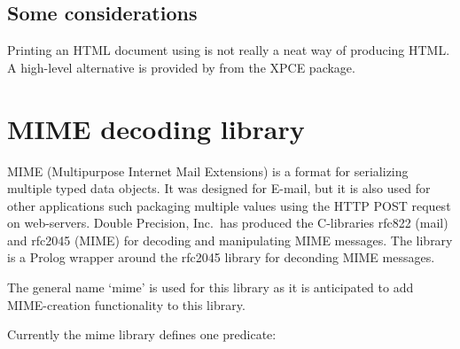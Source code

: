 \documentclass[11pt]{article}
\begin{document}
\noindent
\subsection{Some considerations}

Printing an HTML document using  is not really a neat way
of producing HTML.  A high-level alternative is provided by
 from the XPCE package.


\section{MIME decoding library}

MIME (Multipurpose Internet Mail Extensions) is a format for serializing
multiple typed data objects.  It was designed for E-mail, but it is also
used for other applications such packaging multiple values using the
HTTP POST request on web-servers.  Double Precision, Inc.\ has produced
the C-libraries rfc822 (mail) and rfc2045 (MIME) for decoding and
manipulating MIME messages. The  library is a Prolog wrapper
around the rfc2045 library for deconding MIME messages.	

The general name `mime' is used for this library as it is anticipated to
add MIME-creation functionality to this library.

Currently the mime library defines one predicate:
\end{document}
